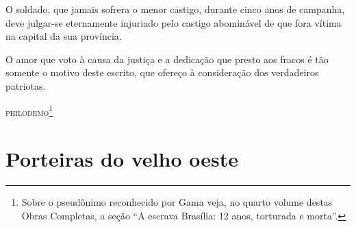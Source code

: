 O soldado, que jamais sofrera o menor castigo, durante cinco anos de
campanha, deve julgar-se eternamente injuriado pelo castigo abominável
de que fora vítima na capital da sua província.

O amor que voto à causa da justiça e a dedicação que presto aos fracos é
tão somente o motivo deste escrito, que ofereço à consideração dos
verdadeiros patriotas.

\begin{flushright}
\textsc{philodemo}\footnote{Sobre o pseudônimo reconhecido por Gama veja, no
  quarto volume destas Obras Completas, a seção ``A escrava Brasília:
  12 anos, torturada e morta''.}
\end{flushright}

\part{Porteiras do velho oeste}

